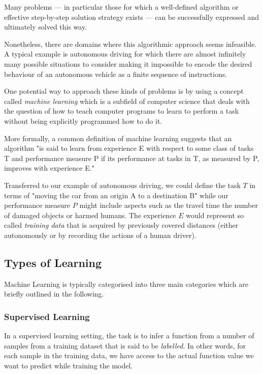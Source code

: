Many problems --- in particular those for which a well-defined algorithm or effective step-by-step solution strategy exists --- can be successfully expressed and ultimately solved this way. 

Nonetheless, there are domains where this algorithmic approach seems infeasible. A typical example is autonomous driving for which there are almost infinitely many possible situations to consider making it impossible to encode the desired behaviour of an autonomous vehicle as a finite sequence of instructions. 

One potential way to approach these kinds of problems is by using a concept called \emph{machine learning} which is a subfield of computer science that deals with the question of how to teach computer programs to learn to perform a task without being explicitly programmed how to do it. 

More formally, a common definition of machine learning suggests that an algorithm "is said to learn from experience E with respect to some class of tasks T and performance measure P if its performance at tasks in T, as measured by P, improves with experience E." \cite{ml-definition}

Transferred to our example of autonomous driving, we could define the task $T$ in terms of "moving the car from an origin A to a destination B" while our performance measure $P$ might include aspects such as the travel time the number of damaged objects or harmed humans. The experience $E$ would represent so called \emph{training data} that is acquired by previously covered distances (either autonomously or by recording the actions of a human driver). 


\subsection{Types of Learning}
Machine Learning is typically categorised into three main categories which are briefly outlined in the following. 

\subsubsection{Supervised Learning} 
In a supervised learning setting, the task is to infer a function from a number of samples from a training dataset that is said to be \emph{labelled}. In other words, for each sample in the training data, we have access to the actual function value we want to predict while training the model. 

